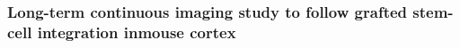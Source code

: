 \subsubsection{Long-term continuous imaging study to follow grafted stem-cell integration inmouse cortex}